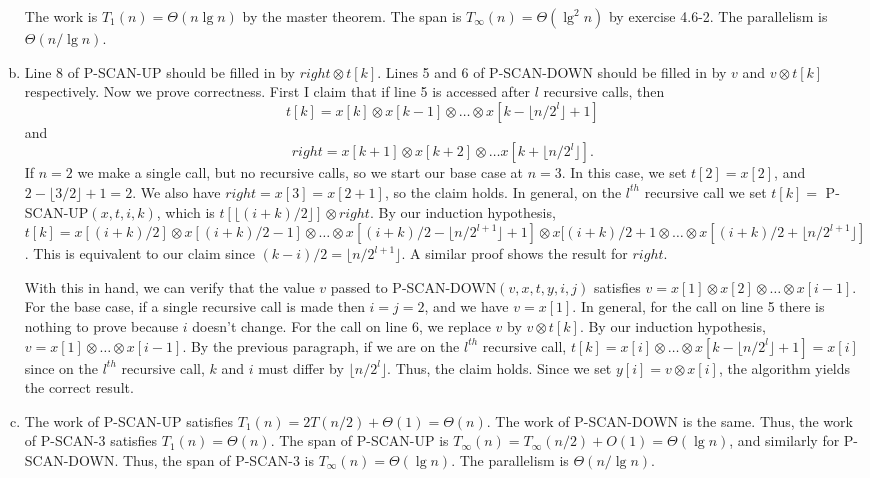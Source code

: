 \documentclass{article}
\begin{document}
\begin{enumerate}[a.]
The work is $T_1(n) = \Theta(n \lg n)$ by the master theorem.  The span is $T_\infty(n) = \Theta(\lg^2n)$ by exercise 4.6-2. The parallelism is $\Theta(n/\lg n)$.\\

\item Line 8 of P-SCAN-UP should be filled in by $right \otimes t[k]$.  Lines 5 and 6 of P-SCAN-DOWN should be filled in by $v$ and $v \otimes t[k]$ respectively.  Now we prove correctness.  First I claim that if line 5 is accessed after $l$ recursive calls, then 
\[t[k] = x[k] \otimes x[k-1] \otimes \ldots \otimes x[k-\lfloor n/2^l\rfloor + 1]\]
 and 
\[right = x[k+1] \otimes x[k+2] \otimes \ldots x[k+ \lfloor n/2^l \rfloor ].\]
If $n=2$ we make a single call, but no recursive calls, so we start our base case at $n=3$.  In this case, we set $t[2] = x[2]$, and $2-\lfloor3/2\rfloor+1 = 2$.  We also have $right = x[3] = x[2+1]$, so the claim holds.  In general, on the $l^{th}$ recursive call we set $t[k] = $ P-SCAN-UP$(x,t,i,k)$, which is $t[\lfloor (i+k)/2 \rfloor] \otimes right$. By our induction hypothesis, $t[k] = x[(i+k)/2] \otimes x[(i+k)/2 - 1] \otimes \ldots \otimes x[(i+k)/2 - \lfloor n/2^{l+1}\rfloor + 1] \otimes x[(i+k)/2 + 1 \otimes \ldots \otimes x[(i+k)/2 +   \lfloor n/2^{l+1}\rfloor]$.  This is equivalent to our claim since $(k-i)/2 =  \lfloor n/2^{l+1}\rfloor$. A similar proof shows the result for $right$.  

With this in hand, we can verify that the value $v$ passed to P-SCAN-DOWN$(v,x,t,y,i,j)$ satisfies $v = x[1] \otimes x[2] \otimes \ldots \otimes x[i-1]$.  For the base case, if a single recursive call is made then $i = j = 2$, and we have $v = x[1]$.  In general, for the call on line 5 there is nothing to prove because $i$ doesn't change.  For the call on line 6, we replace $v$ by $v \otimes t[k]$.  By our induction hypothesis, $v = x[1] \otimes \ldots \otimes x[i-1]$.  By the previous paragraph, if we are on the $l^{th}$ recursive call, $t[k] = x[i] \otimes \ldots \otimes x[k - \lfloor n/2^{l} \rfloor + 1] = x[i]$ since on the $l^{th}$ recursive call, $k$ and $i$ must differ by $\lfloor n/2^{l} \rfloor$. Thus, the claim holds.  Since we set $y[i] = v\otimes x[i]$, the algorithm yields the correct result. \\

\item The work of P-SCAN-UP satisfies $T_1(n) = 2T(n/2) + \Theta(1) = \Theta(n)$.  The work of P-SCAN-DOWN is the same.  Thus, the work of P-SCAN-3 satisfies $T_1(n) = \Theta(n)$. The span of P-SCAN-UP is $T_\infty(n) = T_\infty(n/2) + O(1) = \Theta(\lg n)$, and similarly for P-SCAN-DOWN.  Thus, the span of P-SCAN-3 is $T_\infty(n) = \Theta(\lg n)$.  The parallelism is $\Theta(n/\lg n)$. \\
\end{enumerate}
\end{document}
